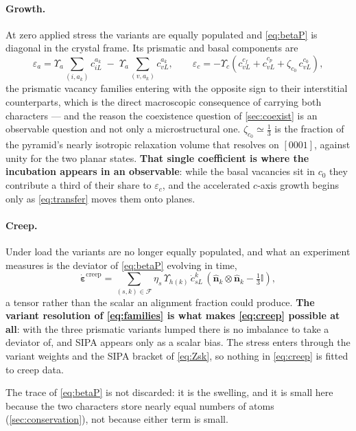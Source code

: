 \documentclass{article}
\begin{document}
\paragraph{Growth.} At zero applied stress the variants are equally populated and
\cref{eq:betaP} is diagonal in the crystal frame. Its prismatic and basal
components are
\begin{equation}
  \varepsilon_a=\Upsilon_a\!\!\sum_{(i,a_k)}\!\!c^{a_k}_{iL}
    \;-\;\Upsilon_a\!\!\sum_{(v,a_k)}\!\!c^{a_k}_{vL},
  \qquad
  \varepsilon_c=-\Upsilon_c\left(c^{c_f}_{vL}+c^{c_p}_{vL}
        +\zeta_{c_0}\,c^{c_0}_{vL}\right),
  \label{eq:strain}
\end{equation}
the prismatic vacancy families entering with the opposite sign to their
interstitial counterparts, which is the direct macroscopic consequence of
carrying both characters --- and the reason the coexistence question of
\cref{sec:coexist} is an observable question and not only a microstructural one.
$\zeta_{c_0}\simeq\tfrac13$ is the fraction of the pyramid's nearly isotropic
relaxation volume that resolves on $[0001]$, against unity for the two planar
states. \textbf{That single coefficient is where the incubation appears in an
observable}: while the basal vacancies sit in $c_0$ they contribute a third of
their share to $\varepsilon_c$, and the accelerated $c$-axis growth begins only as
\cref{eq:transfer} moves them onto planes.

\paragraph{Creep.} Under load the variants are no longer equally populated, and
what an experiment measures is the deviator of \cref{eq:betaP} evolving in time,
\begin{equation}
  \dot{\bm\varepsilon}^{\mathrm{creep}}
   = \sum_{(s,k)\in\mathcal F}\eta_s\,\Upsilon_{h(k)}\,
     \dot c^{k}_{sL}\,\left(\hat{\bm n}_k\otimes\hat{\bm n}_k
       -\tfrac13\mathbb I\right),
  \label{eq:creep}
\end{equation}
a tensor rather than the scalar an alignment fraction could produce. \textbf{The
variant resolution of \cref{eq:families} is what makes \cref{eq:creep} possible at
all}: with the three prismatic variants lumped there is no imbalance to take a
deviator of, and SIPA appears only as a scalar bias. The stress enters through
the variant weights and the SIPA bracket of \cref{eq:Zsk}, so nothing in
\cref{eq:creep} is fitted to creep data.

The trace of \cref{eq:betaP} is not discarded: it is the swelling, and it is
small here because the two characters store nearly equal numbers of atoms
(\cref{sec:conservation}), not because either term is small.
\end{document}
